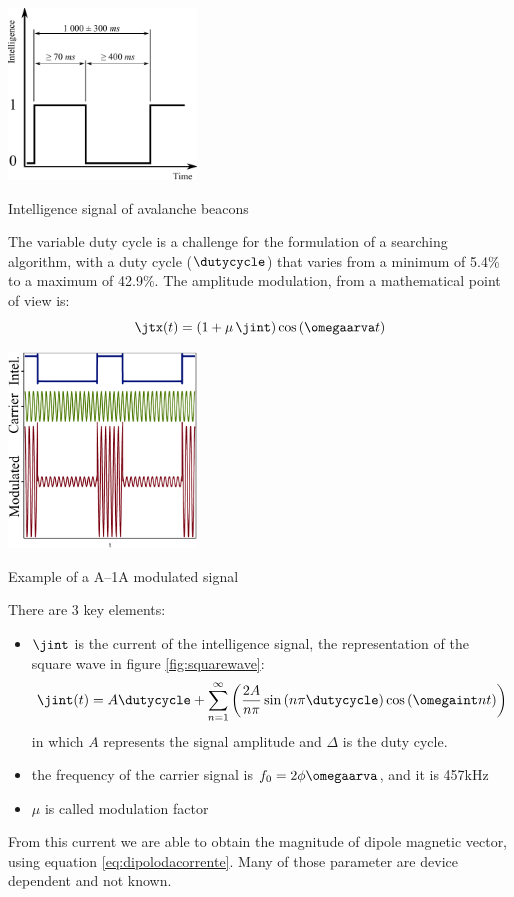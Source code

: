 \begin{marginfigure}
	\centering
	\includegraphics[width=5cm]{ch1/img/artva_signal.pdf}
	\caption{Intelligence signal of avalanche beacons}
	\label{fig:squarewaves}
\end{marginfigure}

The variable duty cycle is a challenge for the formulation of a searching algorithm, with a duty cycle ($\dutycycle$) that varies from a minimum of 5.4\% to a maximum of 42.9\%. The amplitude modulation, from a mathematical point of view is:
\begin{equation}
\jtx(t) = \braces{1+\mu \,\jint}\ccos{\omegaarva t}
\end{equation}
\begin{marginfigure}
	\centering
	\includegraphics[width=5cm]{ch2/img/modulation_example.pdf}
	\caption{Example of a A--1A modulated signal}
\end{marginfigure}
There are 3 key elements:
\begin{itemize}
\item $\jint$ is the current of the intelligence signal, the representation of the square wave in figure \ref{fig:squarewave}:
\begin{equation}
\jint(t) = A\dutycycle + \sum\limits_{n=1}^{\infty}\braces{\dfrac{2A}{n\pi}\ssin{n\pi \dutycycle} \ccos{\omegaint n t}}
\end{equation}
in which $A$ represents the signal amplitude and $\Delta$ is the duty cycle. 
\item the frequency of the carrier signal is $f_0 = 2\phi\omegaarva$, and it is \num{457}\si{\kilo\hertz}
\item $\mu$ is called modulation factor
\end{itemize}
From this current we are able to obtain the magnitude of dipole magnetic vector, using equation \ref{eq:dipolodacorrente}. Many of those parameter are device dependent and not known.




\clearpage



